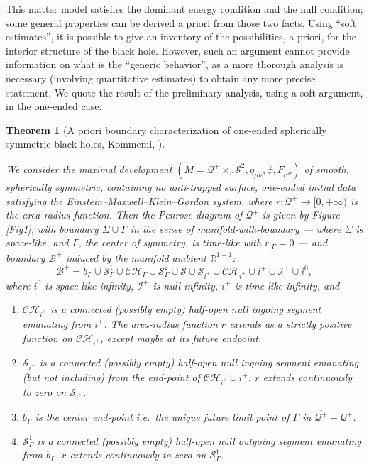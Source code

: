 \documentclass[10pt,a4paper]{article}
\theoremstyle{plain}
\newtheorem{theotwo}{Theorem}
\theoremstyle{remark}
\theoremstyle{definition}
\newcommand{\RR}{\mathbb{R}}
\theoremstyle{plain}
\theoremstyle{remark}
\theoremstyle{definition}
\newcommand{\CH}{\mathcal{CH}_{i^+}}
\numberwithin{equation}{section}
\begin{document}
 	This matter model satisfies the dominant energy condition and the null condition; some general properties can be derived a priori from those two facts. Using ``soft estimates'', it is possible to give an inventory of the possibilities, a priori, for the interior structure of the black hole. However, such an argument cannot provide information on what is the ``generic behavior'', as a more thorough analysis is necessary (involving quantitative estimates) to obtain any more precise statement. We quote the result of the preliminary analysis, using a soft argument, in the one-ended case:
 	\begin{theotwo}[A priori boundary characterization of one-ended spherically symmetric black holes, Kommemi, \cite{Kommemi}] \label{oneendedapriori}
 		
 		We consider the maximal development $(M=\mathcal{Q}^+ \times_r \mathcal{S}^2,g_{\mu \nu}, \phi,F_{\mu \nu})$ of smooth, spherically symmetric, containing no anti-trapped surface, one-ended initial data satisfying the Einstein--Maxwell--Klein--Gordon system, where $r: \mathcal{Q}^+ \rightarrow [0,+\infty)$ is the area-radius function. Then the Penrose diagram of $\mathcal{Q}^+$ is given by Figure \ref{Fig1}, with boundary $\Sigma \cup \Gamma$ in the sense of manifold-with-boundary --- where $\Sigma$ is space-like, and $\Gamma$, the center of symmetry, is time-like with $r_{|\Gamma}=0$ --- and boundary $\mathcal{B}^+$ induced by the manifold ambient $\RR^{1+1}$: $$ \mathcal{B}^+ = b_{\Gamma} \cup \mathcal{S}^1_{\Gamma} \cup \mathcal{CH}_{\Gamma} \cup  \mathcal{S}^2_{\Gamma} \cup  \mathcal{S}  \cup \mathcal{S}_{i^+}  \cup \CH \cup i^{+} \cup \mathcal{I}^+ \cup i^0,$$  where $i^0$ is space-like infinity, $\mathcal{I}^+$ is null infinity, $i^{+}$ is time-like infinity, and \begin{enumerate}
 			\item $\CH$ is a connected (possibly empty) half-open null ingoing segment emanating from $i^{+}$. The area-radius function $r$ extends as a strictly positive function on $\CH$, except maybe at its future endpoint.
 			\item $\mathcal{S}_{i^+}$ is a connected (possibly empty) half-open null ingoing segment emanating (but not including) from the end-point of $\CH \cup i^{+}$. $r$ extends continuously to zero on $\mathcal{S}_{i^+}$.
 			\item $b_{\Gamma}$ is the center end-point i.e.\ the unique future limit point of $\Gamma$ in $\overline{\mathcal{Q}^+}-\mathcal{Q}^+$.
 			\item $ \mathcal{S}^1_{\Gamma} $ is a connected (possibly empty) half-open null outgoing segment emanating from $b_{\Gamma}$. $r$ extends continuously to zero on $ \mathcal{S}^1_{\Gamma} $.

\end{enumerate}
\end{theotwo}
\end{document}
